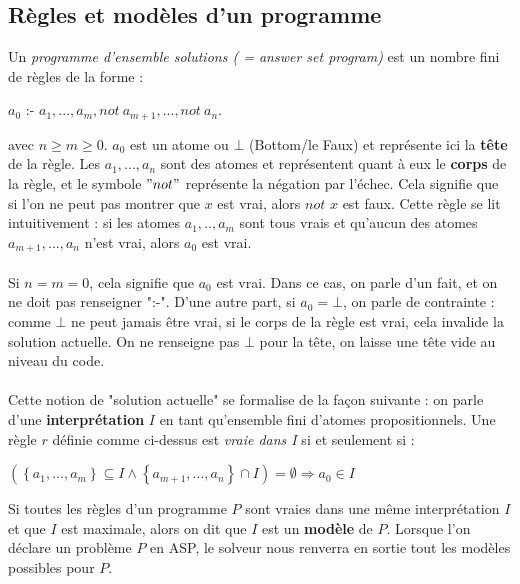 \documentclass[12pt,a4paper]{article}
\begin{document}
\subsection{Règles et modèles d'un programme}
Un \emph{programme d'ensemble solutions ( = answer set program)} est un nombre fini de règles de la forme :

\begin{center}
$a_0$ :- $a_1,...,a_m,not \: a_{m+1},...,not \: a_n.$
\end{center}
avec $n\geq m\geq 0$. $a_0$ est un atome ou $\bot$ (Bottom/le Faux) et représente ici la \textbf{tête} de la règle. Les $a_1,...,a_n$ sont des atomes et représentent quant à eux le \textbf{corps} de la règle, et le symbole $"not"$ 
représente la négation par l'échec. Cela signifie que si l'on ne peut pas montrer que $x$ est vrai, alors $not$ $x$ est faux. Cette règle se lit intuitivement : si les atomes $a_1,..,a_m$ sont tous vrais et qu'aucun des atomes 
$a_{m+1},...,a_n$ n'est vrai, alors $a_0$ est vrai.\\ \\
Si $n=m=0$, cela signifie que $a_0$ est vrai. Dans ce cas, on parle d'un fait, et on ne doit pas renseigner ":-". D'une autre part, si $a_0=\bot$, on parle de contrainte : comme $\bot$ ne peut jamais être vrai, si le corps de la 
règle est vrai, cela 
invalide la solution actuelle. On ne renseigne pas $\bot$ pour la tête, on laisse une tête vide au niveau du code.\\ \\
Cette notion de "solution actuelle" se formalise de la façon suivante : on parle d'une \textbf{interprétation} $I$ en tant qu'ensemble fini d'atomes propositionnels. Une règle $r$ définie comme ci-dessus est \emph{vraie dans I} si 
et seulement si :

\begin{center}
$(\left\{a_1,...,a_m\right\}\subseteq I \wedge \left\{a_{m+1},...,a_n\right\} \cap I) = \emptyset \Rightarrow a_0 \in I$
\end{center}

Si toutes les règles d'un programme $P$ sont vraies dans une même interprétation $I$ et que $I$ est maximale, alors on dit que $I$ est un \textbf{modèle} de $P$. Lorsque l'on déclare un problème $P$ en ASP, le solveur nous renverra en sortie tout 
les modèles possibles pour $P$.
\end{document}
